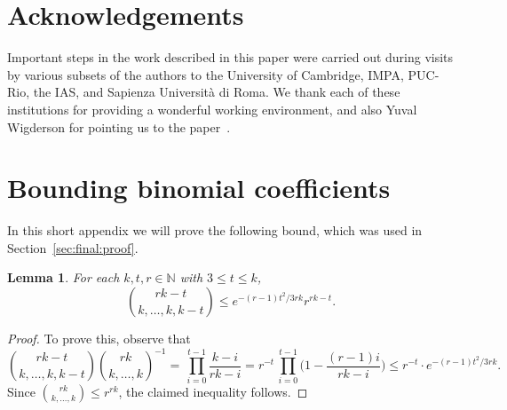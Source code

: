 \documentclass[12pt,reqno]{amsart}
\newtheorem{lemma}[theorem]{Lemma}
\theoremstyle{definition}
\theoremstyle{remark}
\newcommand\N{\mathbb{N}}
\renewcommand{\le}{\leqslant}
\def\N{\mathbb{N}}
\begin{document}
\section*{Acknowledgements}

Important steps in the work described in this paper were carried out during visits by various subsets of the authors to the University of Cambridge, IMPA, PUC-Rio, the IAS, %
and Sapienza Università di Roma. We thank each of these institutions for providing a wonderful working environment, and also Yuval Wigderson for pointing us to the paper~\cite{A72}. 

\appendix

\section{Bounding binomial coefficients}\label{app:binomial}

In this short appendix we will prove the following bound, which was used in Section~\ref{sec:final:proof}. 

\begin{lemma}\label{lem:multibounds}
For each $k,t,r \in \N$ with $3 \le t \le k$, 
$$\binom{rk-t}{k,\dots,k,k-t} \le e^{-(r-1)t^2/3rk} r^{rk-t}.$$
\end{lemma}
 
\begin{proof}
To prove this, observe that 
$$\binom{rk-t}{k,\dots,k,k-t} \binom{rk}{k,\dots,k}^{-1} = \, \prod_{i = 0}^{t - 1} \frac{k - i}{rk - i} = r^{-t} \,\prod_{i = 0}^{t-1} \bigg( 1 - \frac{(r-1)i}{rk - i} \bigg) \le r^{-t} \cdot e^{-(r-1)t^2/3rk}.$$
Since $\binom{rk}{k,\dots,k} \le r^{rk}$, the claimed inequality follows.
\end{proof}
\end{document}

